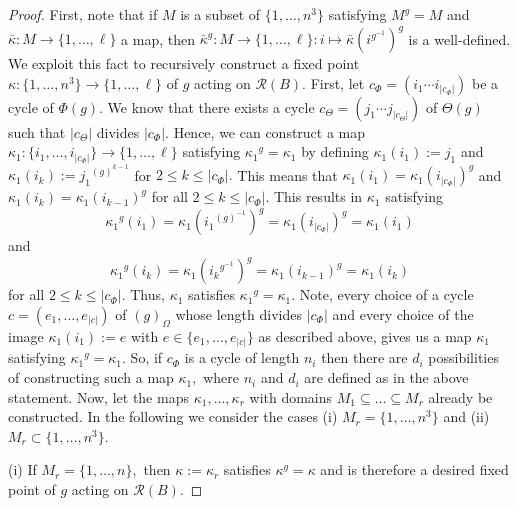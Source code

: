 \documentclass[12pt]{article}
\theoremstyle{definition}
\theoremstyle{remark}
\begin{document}
\begin{proof}
First, note that if $M$ is a subset of $\{1,\ldots,n^3\}$ satisfying $M^{g}=M$ and $\bar{\kappa}:M\to \{1,\ldots,\ell\}$ a map, then $\bar{\kappa}^{g}:M\to \{1,\ldots,\ell\}: i \mapsto \bar{\kappa}(i^{g^{-1}})^{g}$  is a well-defined.
We exploit this fact to recursively construct a fixed point $\kappa:\{1,\ldots,n^3\} \to \{1,\ldots,\ell\}$ of $g$ acting on $\mathcal{R}(B)$. First, let $c_{\Phi}=(i_1 \cdots  i_{\vert c_\Phi\vert})$ be a cycle of $\Phi(g)$.
 We know that there exists a cycle $c_\Theta=(j_1 \cdots  j_{\vert c_\Theta\vert })$ of $\Theta(g)$ such that $\vert c_\Theta\vert $ divides $\vert c_\Phi\vert.$
 Hence, we can construct a map $\kappa_1:\{i_1,\ldots,i_{\vert c_\Phi\vert }\} \to \{1,\ldots,\ell\}$ satisfying ${\kappa_1}^{g}=\kappa_1$ by defining $\kappa_1(i_1):=j_1$ and $\kappa_1(i_k):={j_1}^{(g)^{k-1}}$ for $2\leq k \leq \vert c_\Phi\vert .$
 This means that $\kappa_1(i_1)=\kappa_1({i_{\vert c_\Phi\vert }})^{g}$ and $\kappa_1(i_k)=\kappa_1({i_{k-1}})^{g}$ for all $2\leq k \leq \vert c_\Phi\vert .$ This results in $\kappa_1$ satisfying
 \[
{\kappa_1}^{g}(i_{1})={\kappa_1}({i_{1}}^{(g)^{-1}})^{g}=\kappa_1(i_{\vert c_{\Phi}\vert })^{g}=\kappa_1(i_1)
\]
 and
\[
{\kappa_1}^{g}(i_{k})={\kappa_1}({i_{k}}^{g^{-1}})^{g}=\kappa_1(i_{k-1})^{g}=\kappa_1(i_k)
\]
for all $2\leq k\leq \vert c_\Phi\vert$. Thus, $\kappa_1$ satisfies ${\kappa_1}^{g}=\kappa_1$.
Note, every choice of a cycle $c=(e_1,\ldots,e_{\vert c \vert})$ of $(g)_\Omega$ whose length divides $\vert c_\Phi\vert$ and every choice of the image
$\kappa_1(i_1):=e$ with $e\in \{e_1,\ldots, e_{\vert c\vert} \}$ as described above, gives us a map $\kappa_1$ satisfying ${\kappa_1}^{g}=\kappa_1$.
So, if $c_\Phi$ is a cycle of length $n_i$ then there are $d_i$ possibilities of constructing such a map $\kappa_1,$ where $n_i$ and $d_i$ are defined as in the above statement.
Now, let the maps $\kappa_1,\ldots,\kappa_r$ with domains $M_1\subseteq \ldots \subseteq  M_r$ already be constructed. In the following we consider the cases (i) $M_r=\{1,\ldots,n^3\}$ and (ii)~$M_r\subset \{1,\ldots,n^3\}.$

(i) If $M_r=\{1,\ldots,n\},$ then $\kappa:=\kappa_r$ satisfies $\kappa^{g}=\kappa$ and is therefore a desired fixed point of $g$ acting on $\mathcal{R}(B)$.


\end{proof}
\end{document}

